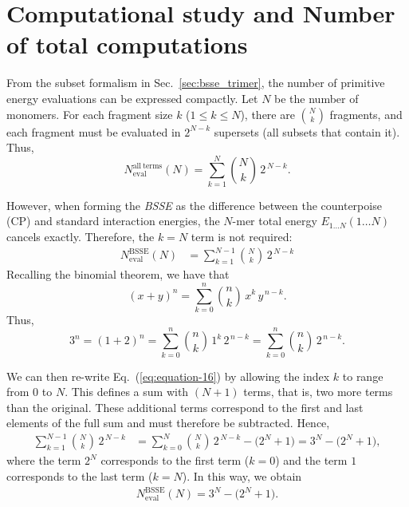 \section{Computational study and Number of total computations}
\label{sec:plan}

From the subset formalism in Sec.~\ref{sec:bsse_trimer}, the number of
primitive energy evaluations can be expressed compactly. Let $N$ be the
number of monomers. For each fragment size $k$ ($1\le k\le N$), there are
$\binom{N}{k}$ fragments, and each fragment must be evaluated in
$2^{N-k}$ supersets (all subsets that contain it). Thus,
\begin{equation}
N_{\mathrm{eval}}^{\mathrm{all\ terms}}(N)
= \sum_{k=1}^{N} \binom{N}{k}\,2^{\,N-k}.
\label{eq:Neval_all}
\end{equation}

However, when forming the \emph{BSSE} as the difference between the
counterpoise (CP) and standard interaction energies, the $N$-mer total
energy $E_{1\ldots N}(1\ldots N)$ cancels exactly. Therefore, the
$k=N$ term is not required:
\begin{align}
N_{\mathrm{eval}}^{\mathrm{BSSE}}(N)
&= \sum_{k=1}^{N-1} \binom{N}{k}\,2^{\,N-k}
\label{eq:equation-16}
\end{align}
\clearpage
Recalling the binomial theorem\autocite{Beeler2015}, we have that
\[
(x+y)^{n}
  = \sum_{k=0}^{n} \binom{n}{k}\,x^{k}\,y^{\,n-k}.
\]
Thus,
\begin{equation*}
    3^{n}
    = (1+2)^{n}
    = \sum_{k=0}^{n} \binom{n}{k}\,1^{k}\,2^{\,n-k}
    = \sum_{k=0}^{n} \binom{n}{k}\,2^{\,n-k}.
\end{equation*}

\noindent
We can then re-write Eq.~(\ref{eq:equation-16}) by allowing the index
$k$ to range from $0$ to $N$. This defines a sum with $(N+1)$ terms,
that is, two more terms than the original.
These additional terms correspond to the first and last elements of
the full sum and must therefore be subtracted. Hence,
\begin{align*}
\sum_{k=1}^{N-1} \binom{N}{k}\,2^{\,N-k}
&=
\sum_{k=0}^{N} \binom{N}{k}\,2^{\,N-k}
 - \bigl(2^{N} + 1\bigr)
 = 3^{N} - \bigl(2^{N} + 1\bigr),
\end{align*}
where the term $2^{N}$ corresponds to the first term ($k=0$)
and the term $1$ corresponds to the last term ($k=N$).
In this way, we obtain
\begin{align}
N_{\mathrm{eval}}^{\mathrm{BSSE}}(N)
   = 3^{N} - \bigl(2^{N} + 1\bigr).
\label{eq:equation-18}
\end{align}

